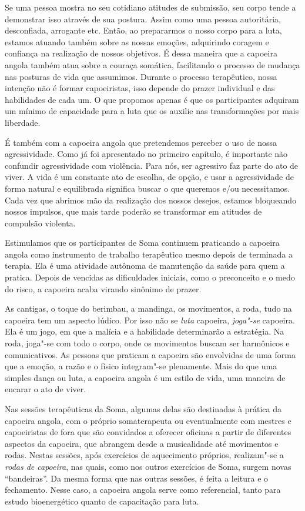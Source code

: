 Se uma pessoa mostra no seu cotidiano atitudes de submissão, seu corpo
tende a demonstrar isso através de sua postura. Assim como uma pessoa
autoritária, desconfiada, arrogante etc. Então, ao prepararmos o nosso
corpo para a luta, estamos atuando também sobre as nossas emoções,
adquirindo coragem e confiança na realização de nossos objetivos. É
dessa maneira que a capoeira angola também atua sobre a couraça
somática, facilitando o processo de mudança nas posturas de vida que
assumimos. Durante o processo terapêutico, nossa intenção não é formar
capoeiristas, isso depende do prazer individual e das habilidades de
cada um. O que propomos apenas é que os participantes adquiram um mínimo
de capacidade para a luta que os auxilie nas transformações por mais
liberdade.

É também com a capoeira angola que pretendemos perceber o uso de nossa
agressividade. Como já foi apresentado no primeiro capítulo, é
importante não confundir agressividade com violência. Para nós, ser
agressivo faz parte do ato de viver. A vida é um constante ato de
escolha, de opção, e usar a agressividade de forma natural e equilibrada
significa buscar o que queremos e/ou necessitamos. Cada vez que abrimos
mão da realização dos nossos desejos, estamos bloqueando nossos
impulsos, que mais tarde poderão se transformar em atitudes de compulsão
violenta.

Estimulamos que os participantes de Soma continuem praticando a capoeira
angola como instrumento de trabalho terapêutico mesmo depois de
terminada a terapia. Ela é uma atividade autônoma de manutenção da saúde
para quem a pratica. Depois de vencidas as dificuldades iniciais, como o
preconceito e o medo do risco, a capoeira acaba virando sinônimo de
prazer.

As cantigas, o toque do berimbau, a mandinga, os movimentos, a roda,
tudo na capoeira tem um aspecto lúdico. Por isso não se \emph{luta}
capoeira, \emph{joga"-se} capoeira. Ela é um jogo, em que a malícia e a
habilidade determinarão a estratégia. Na roda, joga"-se com todo o corpo,
onde os movimentos buscam ser harmônicos e comunicativos. As pessoas que
praticam a capoeira são envolvidas de uma forma que a emoção, a razão e
o físico integram"-se plenamente. Mais do que uma simples dança ou luta,
a capoeira angola é um estilo de vida, uma maneira de encarar o ato de
viver.

Nas sessões terapêuticas da Soma, algumas delas são destinadas à prática
da capoeira angola, com o próprio somaterapeuta ou eventualmente com
mestres e capoeiristas de fora que são convidados a oferecer oficinas a
partir de diferentes aspectos da capoeira, que abrangem desde a
musicalidade até movimentos e rodas. Nestas sessões, após exercícios de
aquecimento próprios, realizam"-se a \emph{rodas de capoeira}, nas quais,
como nos outros exercícios de Soma, surgem novas ``bandeiras''. Da mesma
forma que nas outras sessões, é feita a leitura e o fechamento. Nesse
caso, a capoeira angola serve como referencial, tanto para estudo
bioenergético quanto de capacitação para luta.

